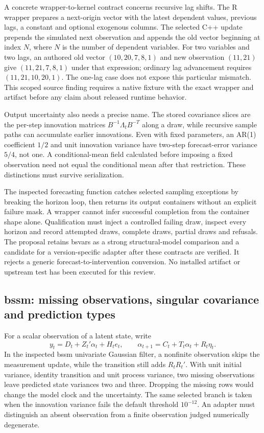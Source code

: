 A concrete wrapper-to-kernel contract concerns recursive lag shifts. The R wrapper prepares a next-origin vector with the latest dependent values, previous lags, a constant and optional exogenous columns. The selected C++ update prepends the simulated next observation and appends the old vector beginning at index $N$, where $N$ is the number of dependent variables. For two variables and two lags, an authored old vector $(10,20,7,8,1)$ and new observation $(11,21)$ give $(11,21,7,8,1)$ under that expression; ordinary lag advancement requires $(11,21,10,20,1)$. The one-lag case does not expose this particular mismatch. This scoped source finding requires a native fixture with the exact wrapper and artifact before any claim about released runtime behavior.\citep{exec25_cdyn_bsvars,exec25_cdyn_choice}

Output uncertainty also needs a precise name. The stored covariance slices are the per-step innovation matrices $B^{-1}\Lambda_tB^{-T}$ along a draw, while recursive sample paths can accumulate earlier innovations. Even with fixed parameters, an AR(1) coefficient $1/2$ and unit innovation variance have two-step forecast-error variance $5/4$, not one. A conditional-mean field calculated before imposing a fixed observation need not equal the conditional mean after that restriction. These distinctions must survive serialization.\citep{exec25_cdyn_bsvars,exec25_cdyn_choice}

The inspected forecasting function catches selected sampling exceptions by breaking the horizon loop, then returns its output containers without an explicit failure mask. A wrapper cannot infer successful completion from the container shape alone. Qualification must inject a controlled failing draw, inspect every horizon and record attempted draws, complete draws, partial draws and refusals. The proposal retains bsvars as a strong structural-model comparison and a candidate for a version-specific adapter after these contracts are verified. It rejects a generic forecast-to-intervention conversion. No installed artifact or upstream test has been executed for this review.

\subsection{bssm: missing observations, singular covariance and prediction types}

For a scalar observation of a latent state, write
\[
 y_t=D_t+Z_t'\alpha_t+H_t e_t,\qquad
 \alpha_{t+1}=C_t+T_t\alpha_t+R_t\eta_t.
\]
In the inspected bssm univariate Gaussian filter, a nonfinite observation skips the measurement update, while the transition still adds $R_tR_t'$. With unit initial variance, identity transition and unit process variance, two missing observations leave predicted state variances two and three. Dropping the missing rows would change the model clock and the uncertainty. The same selected branch is taken when the innovation variance fails the default threshold $10^{-12}$. An adapter must distinguish an absent observation from a finite observation judged numerically degenerate.\citep{exec25_cdyn_bssm,exec25_cdyn_choice}

